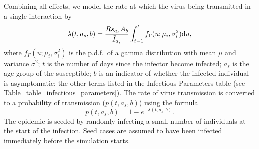 \documentclass[11pt, oneside]{amsart}   	%
\begin{document}
Combining all effects, we model the rate at which the virus being transmitted in a single interaction by
\begin{equation}
\lambda(t,a_s,b) = \frac{R s_{a_s}A_b}{ \bar I_{a_s}} \int_{t-1}^t f_{\Gamma}(u; \mu_i,\sigma_i^2) {\rm d}u,
\end{equation}
where $f_{\Gamma}(u; \mu_i,\sigma_i^2)$ is the p.d.f.\ of a gamma distribution with mean $\mu$ and variance $\sigma^2$; $t$ is the number of days since the infector become infected; $a_s$ is the age group of the susceptible; $b$ is an indicator of whether the infected individual is asymptomatic; the other terms listed in the Infectious Parameters table  (see Table~\ref{table_infectious_parameters}).
The rate of virus transmission is converted to a probability of transmission  ($p(t,a_s,b)$) using the formula
\begin{equation}
p(t,a_s,b) = 1 - e^{-\lambda(t,a_s,b)}.
\end{equation}
The epidemic is seeded by randomly infecting a small number of individuals at the start of the infection.  Seed cases are assumed to have been infected immediately before the simulation starts.
\end{document}
